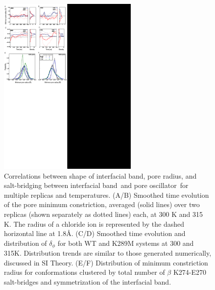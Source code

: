 \documentclass[journal=jacsat,manuscript=article]{achemso}
\newcommand{\fivering}{interfacial band~}
\newcommand{\fiveringnos}{interfacial band}
\newcommand{\triad}{pore oscillator~}
\newcommand{\WT}{WT\xspace}
\newcommand{\MT}{K289M\xspace}
\newcommand{\WTs}{WT systems\xspace}
\newcommand{\MTs}{K289M systems\xspace}
\begin{document}
\begin{figure}[t]
\centering
\includegraphics[height = 3.5in]{figures_2/Pillar_4_fig}
\caption{Correlations between shape of \fiveringnos, pore radius, and salt-bridging between \fivering and \triad for multiple replicas and temperatures.  (A/B) Smoothed time evolution of the pore minimum constriction, averaged (solid lines) over two replicas (shown separately as dotted lines) each, at 300 K and 315 K. 
The radius of a chloride ion is represented by the dashed horizontal line at 1.8\AA. 
(C/D) Smoothed time evolution and distribution of $\delta_{\phi}$ for both \WT and \MT systems at 300 and 315K. Distribution trends are similar to those generated numerically, discussed in SI Theory.  %
(E/F) Distribution of minimum constriction radius for conformations clustered by total number of $\beta$ K274-E270 salt-bridges and symmetrization of the \fiveringnos. }%
\label{fig:Pillar_3_fig}
\end{figure}
\end{document}
